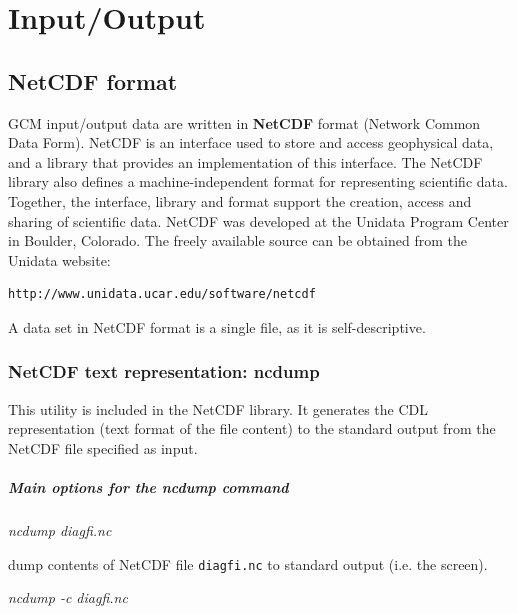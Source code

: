 \chapter{Input/Output}
\label{sc:io}

\section{NetCDF format}

GCM input/output data are written in {\bf NetCDF} format
(Network Common Data Form). NetCDF is an interface used to store and access
geophysical data, and a library that provides an implementation of this
interface. The NetCDF library also defines a machine-independent format for
representing scientific data. 
Together, the interface, library and format support the creation, access and
sharing of scientific data. NetCDF was developed at the Unidata Program Center
in Boulder, Colorado. The freely available source can be obtained from
the Unidata website:
\begin{verbatim}
http://www.unidata.ucar.edu/software/netcdf
\end{verbatim}



A data set in NetCDF format is a single file, as it is self-descriptive.

\subsection{NetCDF text representation: ncdump}

This utility is included in the NetCDF library.
It generates the CDL representation (text format of the file content) to the standard output
from the NetCDF file specified as input. 

\paragraph{Main options for the ncdump command}

\begin{center}
{\it ncdump diagfi.nc}
\end{center}

\noindent
dump contents of NetCDF file {\tt diagfi.nc} to standard output
(i.e. the screen).

\begin{center}
{\it ncdump -c diagfi.nc}
\end{center}

